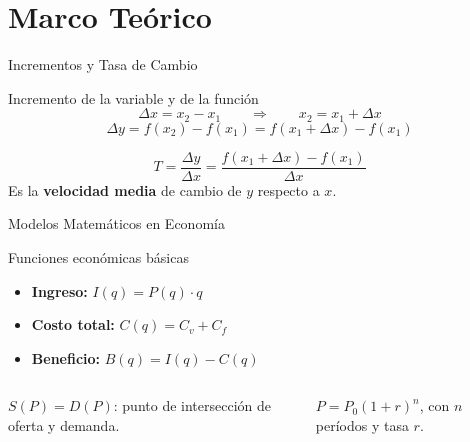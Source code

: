 \documentclass[aspectratio=169]{beamer}
\begin{document}
\begin{frame}[plain]
  \titlepage
\end{frame}

\section{Marco Teórico}

\begin{frame}{Incrementos y Tasa de Cambio}
  \begin{block}{Incremento de la variable y de la función}
    \[
      \Delta x = x_2 - x_1
      \qquad\Longrightarrow\qquad
      x_2 = x_1 + \Delta x
    \]
    \[
      \Delta y = f(x_2) - f(x_1) = f(x_1 + \Delta x) - f(x_1)
    \]
  \end{block}
  \vspace{4pt}
  \begin{mwextra}
    \[
      T = \frac{\Delta y}{\Delta x} = \frac{f(x_1 + \Delta x) - f(x_1)}{\Delta x}
    \]
    Es la \textbf{velocidad media} de cambio de $y$ respecto a $x$.
  \end{mwextra}
\end{frame}

\begin{frame}{Modelos Matemáticos en Economía}
  \begin{block}{Funciones económicas básicas}
    \begin{itemize}
      \item \textbf{Ingreso:} $I(q) = P(q)\cdot q$
      \item \textbf{Costo total:} $C(q) = C_v + C_f$
      \item \textbf{Beneficio:} $B(q) = I(q) - C(q)$
    \end{itemize}
  \end{block}
  \vspace{4pt}
  \begin{columns}[T]
    \begin{mwpasos}
      $S(P) = D(P)$: punto de intersección de oferta y demanda.
    \end{mwpasos}
    \begin{mwextra}
      $P = P_0(1+r)^{n}$, con $n$ períodos y tasa $r$.
    \end{mwextra}
  \end{columns}
\end{frame}
\end{document}
